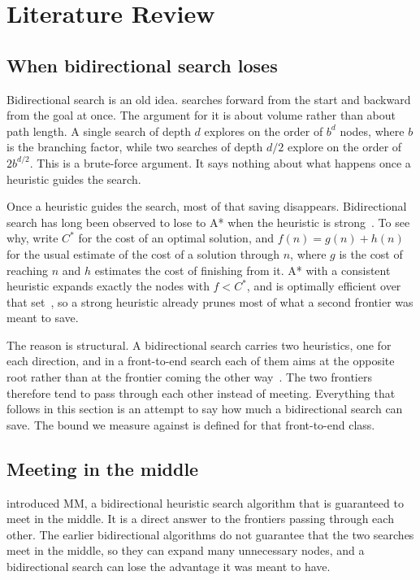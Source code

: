 \documentclass[letterpaper]{article} %
\begin{document}
\section{Literature Review}\label{sec:litrev}

\subsection{When bidirectional search loses}
Bidirectional search is an old idea. \citet{pohl1971bidirectional} searches forward from the start and backward from the goal at once. The argument for it is about volume rather than about path length. A single search of depth $d$ explores on the order of $b^d$ nodes, where $b$ is the branching factor, while two searches of depth $d/2$ explore on the order of $2b^{d/2}$. This is a brute-force argument. It says nothing about what happens once a heuristic guides the search.

Once a heuristic guides the search, most of that saving disappears. Bidirectional search has long been observed to lose to A* when the heuristic is strong~\cite{barker2015limitations}. To see why, write $C^*$ for the cost of an optimal solution, and $f(n) = g(n) + h(n)$ for the usual estimate of the cost of a solution through $n$, where $g$ is the cost of reaching $n$ and $h$ estimates the cost of finishing from it. A* with a consistent heuristic expands exactly the nodes with $f < C^*$, and is optimally efficient over that set~\cite{hart1968astar, dechter1985generalized}, so a strong heuristic already prunes most of what a second frontier was meant to save.

The reason is structural. A bidirectional search carries two heuristics, one for each direction, and in a front-to-end search each of them aims at the opposite root rather than at the frontier coming the other way~\cite{kaindl1997reconsidered}. The two frontiers therefore tend to pass through each other instead of meeting. Everything that follows in this section is an attempt to say how much a bidirectional search can save. The bound we measure against is defined for that front-to-end class.

\subsection{Meeting in the middle}
\citet{holte2017mm} introduced MM, a bidirectional heuristic search algorithm that is guaranteed to meet in the middle. It is a direct answer to the frontiers passing through each other. The earlier bidirectional algorithms do not guarantee that the two searches meet in the middle, so they can expand many unnecessary nodes, and a bidirectional search can lose the advantage it was meant to have.
\end{document}
